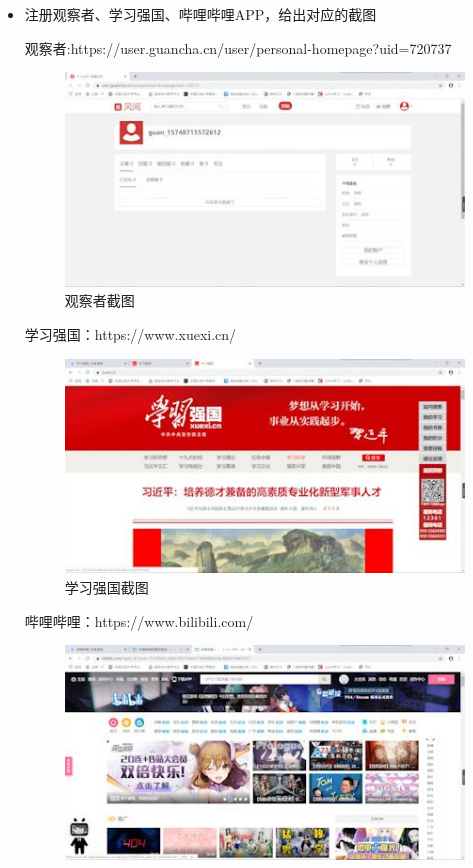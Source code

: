 \documentclass{article}
\begin{document}
\begin{itemize}
    \item 注册观察者、学习强国、哔哩哔哩APP，给出对应的截图\par 
    观察者:https://user.guancha.cn/user/personal-homepage?uid=720737\par
    \begin{figure}[H]
    	\centering
    	\includegraphics[scale=0.6]{GCZ}
    	\caption{观察者截图}\par
    \end{figure}
学习强国：https://www.xuexi.cn/        \par 
   \begin{figure}[H]
	  \centering
	  \includegraphics[scale=0.6]{XXQG}
	  \caption{学习强国截图}\par
   \end{figure}
哔哩哔哩：https://www.bilibili.com/\par 
\begin{figure}[H]
	\centering
	\includegraphics[scale=0.6]{BLBL}

\end{figure}
\end{itemize}
\end{document}
